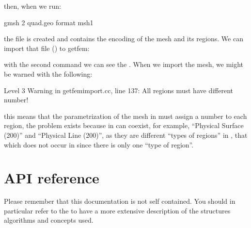 \documentclass[a4paper,11pt,english]{sphinxmanual}
\begin{document}
then, when we run:

\begin{sphinxVerbatim}[commandchars=\\\{\}]
\PYGZdl{} gmsh \PYGZhy{}2 quad.geo \PYGZhy{}format msh1
\end{sphinxVerbatim}

the file  is created and contains the encoding of the mesh and its
regions. We can import that file () to getfem:

\begin{sphinxVerbatim}[commandchars=\\\{\}]
   

  
 
\end{sphinxVerbatim}

with the second command we can see the . When we import the mesh,
we might be warned with the following:

\begin{sphinxVerbatim}[commandchars=\\\{\}]
Level 3 Warning in getfem\PYGZus{}import.cc, line 137:
  All regions must have different number!
\end{sphinxVerbatim}

this means that the parametrization of the mesh in   must
assign a  number to each region, the problem exists because in
 can coexist, for example, “Physical Surface (200)” and “Physical Line
(200)”, as they are different “types of regions” in , that which does
not occur in  since there is only one “type of region”.


\chapter{API reference}
\label{\detokenize{python/cmdref:api-reference}}\label{\detokenize{python/cmdref:api}}\label{\detokenize{python/cmdref::doc}}
Please remember that this documentation is not self contained.
You should in particular refer to the 
to have a more extensive description of the structures algorithms
and concepts used.
\end{document}
